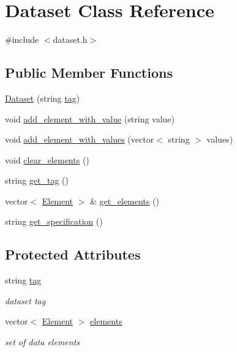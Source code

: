\hypertarget{classDataset}{}\section{Dataset Class Reference}
\label{classDataset}


{\ttfamily \#include $<$dataset.\+h$>$}

\subsection*{Public Member Functions}
\begin{DoxyCompactItemize}
\item 
\hyperlink{classDataset_a6eb00c4455a2d16ca5100996fd28ddf8}{Dataset} (string \hyperlink{classDataset_ae5a301fd4abf5979447bf16fc9775758}{tag})
\item 
void \hyperlink{classDataset_a86a705d9b163d64e812a085acbfb0a81}{add\+\_\+element\+\_\+with\+\_\+value} (string value)
\item 
void \hyperlink{classDataset_af945e29692f141411302850b29d55bfa}{add\+\_\+element\+\_\+with\+\_\+values} (vector$<$ string $>$ values)
\item 
void \hyperlink{classDataset_ac39864fdc124fe2893a42bbbd4a7ecc2}{clear\+\_\+elements} ()
\item 
string \hyperlink{classDataset_a6cb814dbc1aaa07d1a24d326de529302}{get\+\_\+tag} ()
\item 
vector$<$ \hyperlink{classElement}{Element} $>$ \& \hyperlink{classDataset_ad2048268e3dcbbcb8695daaadb00cc65}{get\+\_\+elements} ()
\item 
string \hyperlink{classDataset_a0d41185e47cb27299a46dec2d3717cb4}{get\+\_\+specification} ()
\end{DoxyCompactItemize}
\subsection*{Protected Attributes}
\begin{DoxyCompactItemize}
\item 
\mbox{\label{classDataset_ae5a301fd4abf5979447bf16fc9775758}} 
string \hyperlink{classDataset_ae5a301fd4abf5979447bf16fc9775758}{tag}
\begin{DoxyCompactList}\small\item\em dataset tag \end{DoxyCompactList}\item 
\mbox{\label{classDataset_a455ba8659783cb68146cb914a33f652b}} 
vector$<$ \hyperlink{classElement}{Element} $>$ \hyperlink{classDataset_a455ba8659783cb68146cb914a33f652b}{elements}
\begin{DoxyCompactList}\small\item\em set of data elements \end{DoxyCompactList}\end{DoxyCompactItemize}


